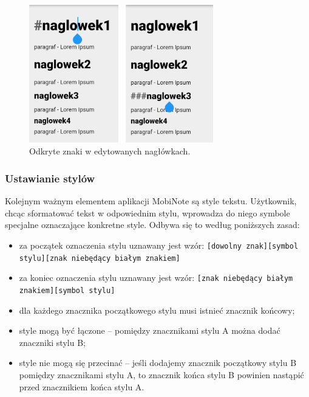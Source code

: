\begin{figure}[ht]
    \centering
    \includegraphics[height=6cm]{images/pokazywanie_naglowkow.png}
    \caption{Odkryte znaki w edytowanych nagłówkach.}
\end{figure}

\subsubsection{Ustawianie stylów}
\label{subsec:ustawianieStyli}

Kolejnym ważnym elementem aplikacji MobiNote są style tekstu. Użytkownik, chcąc sformatować tekst w odpowiednim stylu, wprowadza do niego symbole specjalne oznaczające konkretne style.
Odbywa się to według poniższych zasad:

\begin{itemize}
    \setlength\itemsep{2mm}

    \item za początek oznaczenia stylu uznawany jest wzór: \newline
    \verb|[dowolny znak][symbol stylu][znak niebędący białym znakiem]|
    
    \item za koniec oznaczenia stylu uznawany jest wzór: \newline
    \verb|[znak niebędący białym znakiem][symbol stylu]|

    \item dla każdego znacznika początkowego stylu musi istnieć znacznik końcowy;
    
    \item style mogą być łączone -- pomiędzy znacznikami stylu A można dodać znaczniki stylu B;

    \item style nie mogą się przecinać -- jeśli dodajemy znacznik początkowy stylu B pomiędzy znacznikami stylu A, to znacznik końca stylu B powinien nastąpić przed znacznikiem końca stylu A. 
\end{itemize}

